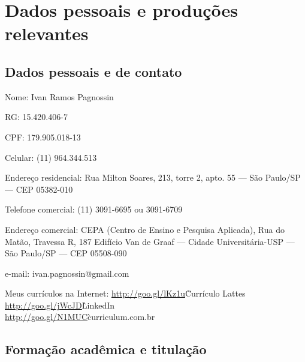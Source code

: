 \chapter{Dados pessoais e produções relevantes}
\label{cap:resumo}

\section*{Dados pessoais e de contato}

\begin{compactdesc}
	\item[Nome:] Ivan Ramos Pagnossin
	\item[RG:] 15.420.406-7
	\item[CPF:] 179.905.018-13
	\item[Celular:] (11) 964.344.513
	\item[Endereço residencial:] Rua Milton Soares, 213, torre 2, apto. 55 --- São Paulo/SP --- CEP 05382-010
	\item[Telefone comercial:] (11) 3091-6695 ou 3091-6709
	\item[Endereço comercial:] CEPA (Centro de Ensino e Pesquisa Aplicada), Rua do Matão, Travessa R, 187
Edifício Van de Graaf --- Cidade Universitária-USP --- São Paulo/SP --- CEP 05508-090
	\item[e-mail:] ivan.pagnossin@gmail.com
\end{compactdesc}

\begin{tabbing}
Meus currículos na Internet: \=\url{http://goo.gl/lKz1u}\`Currículo Lattes\\
														 \>\url{http://goo.gl/jWcJD}\`LinkedIn\\
														 \>\url{http://goo.gl/N1MUC}\`curriculum.com.br
\end{tabbing}

\section*{Formação acadêmica e titulação}

